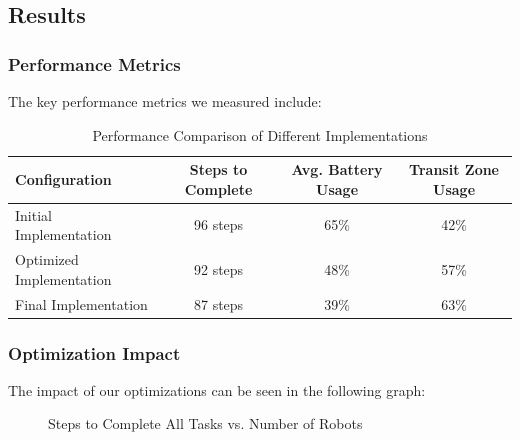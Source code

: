 \documentclass[12pt,a4paper]{article}
\begin{document}
\subsection{Results}

\subsubsection{Performance Metrics}
The key performance metrics we measured include:

\begin{table}[h]
    \centering
    \begin{tabular}{|l|c|c|c|}
        \hline
        \textbf{Configuration} & \textbf{Steps to Complete} & \textbf{Avg. Battery Usage} & \textbf{Transit Zone Usage} \\ \hline
        Initial Implementation & 96 steps & 65\% & 42\% \\ \hline
        Optimized Implementation & 92 steps & 48\% & 57\% \\ \hline
        Final Implementation & 87 steps & 39\% & 63\% \\ \hline
    \end{tabular}
    \caption{Performance Comparison of Different Implementations}
    \label{tab:performance}
\end{table}

\subsubsection{Optimization Impact}
The impact of our optimizations can be seen in the following graph:

\begin{figure}[h]
    \centering
    \caption{Steps to Complete All Tasks vs. Number of Robots}
    \label{fig:steps_vs_robots}
\end{figure}
\end{document}
